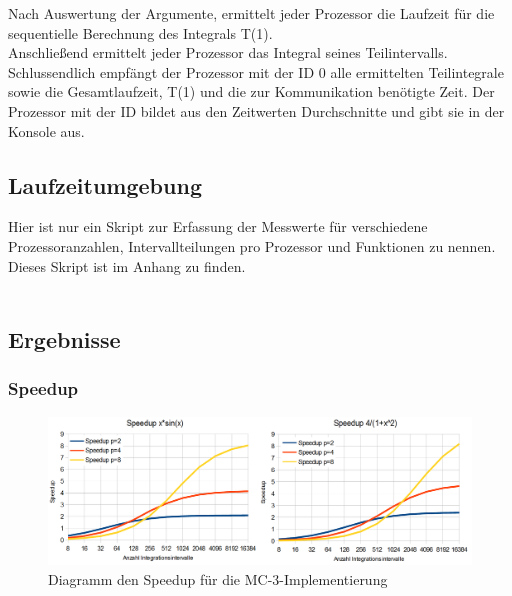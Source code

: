 \documentclass[a4paper,12pt]{scrartcl}
\begin{document}
Nach Auswertung der Argumente, ermittelt jeder Prozessor die Laufzeit f\"ur die sequentielle Berechnung des Integrals T(1).\\
Anschlie\ss{}end ermittelt jeder Prozessor das Integral seines Teilintervalls.
Schlussendlich empf\"angt der Prozessor mit der ID 0 alle ermittelten Teilintegrale sowie die Gesamtlaufzeit, T(1) und die zur
Kommunikation ben\"otigte Zeit.
Der Prozessor mit der ID bildet aus den Zeitwerten Durchschnitte und gibt sie in der Konsole aus.


\subsection{Laufzeitumgebung}
Hier ist nur ein Skript zur Erfassung der Messwerte f\"ur verschiedene Prozessoranzahlen, Intervallteilungen pro Prozessor und Funktionen zu nennen.\\
Dieses Skript ist im Anhang  zu finden.\\\\


\subsection{Ergebnisse}
\subsubsection{Speedup}

\begin{figure}[htb]
  \begin{center}
    \includegraphics[width=1\hsize]{../mc3_speedup.png}
  \end{center}
  \caption{\label{mc3speedup}
    Diagramm den Speedup f\"ur die MC-3-Implementierung}
\end{figure}
\end{document}
